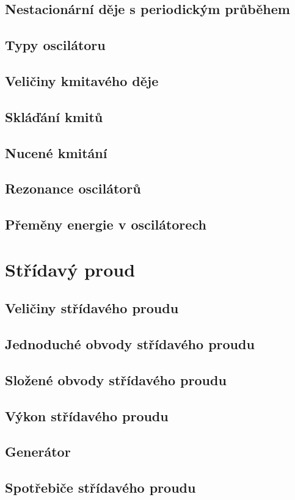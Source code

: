\documentclass[titlepage]{book}
\begin{document}
\section{Nestacionární děje s periodickým průběhem}
\section{Typy oscilátoru}
\section{Veličiny kmitavého děje}
\section{Skláďání kmitů}
\section{Nucené kmitání}
\section{Rezonance oscilátorů}
\section{Přeměny energie v oscilátorech}
\chapter{Střídavý proud}
\section{Veličiny střídavého proudu}
\section{Jednoduché obvody střídavého proudu}
\section{Složené obvody střídavého proudu}
\section{Výkon střídavého proudu}
\section{Generátor}
\section{Spotřebiče střídavého proudu}
\end{document}
